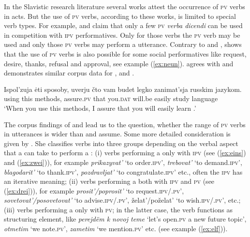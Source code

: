 \documentclass[output=paper,colorlinks,citecolor=brown,newtxmath,hidelinks]{langscibook}
\begin{document}
In the Slavistic research literature several works attest the occurrence of \textsc{pv}  verbs in  acts. But the use of \textsc{pv} verbs, according to these works, is limited to special verb types. For example, \citet{Rjabceva1992} and \citet{Dickey2000} claim that only a few \textsc{pv} \textit{verba dicendi} can be used in competition with \textsc{ipv} performatives. Only for those verbs the \textsc{pv} verb may be used and only those \textsc{pv} verbs may perform a  utterance. Contrary to \citeauthor{Rjabceva1992} and \citeauthor{Dickey2000}, \citeauthor{Wiemer2014} shows that the use of \textsc{pv}  verbs is also possible for some social performatives like request, desire, thanks, refusal and approval, see example (\ref{ex:neun}). \citet{Laczinski2014} agrees with \citeauthor{Wiemer2014} and demonstrates similar corpus data for ,  and .

\ea\label{ex:neun}
\gll Ispol’zuja ėti sposoby, uverju čto vam budet legko zanimat’sja russkim jazykom.\\
             using               this         methods,	assure\textsc{.pv}	   that	         you.\textsc{dat}	  will.be        easily          study                          language\\
\glt ‘When you use this methods, I assure that you will easily learn .’\\
\hfill \citep[107]{Wiemer2014}
\z

\newpage 
\noindent The corpus findings of \citeauthor{Wiemer2014} and \citeauthor{Laczinski2014} lead us to the question, whether the range of \textsc{pv} verbs in  utterances is wider than \citeauthor{Rjabceva1992} and \citeauthor{Dickey2000} assume. Some more detailed consideration is given by \citet{Israeli1996,Israeli2001}. She classifies  verbs into three groups depending on the verbal aspect that a  can take to perform a  \citep[84]{Israeli2001}: (i) verbs performing a  only with \textsc{ipv} (see (\ref{ex:eins}) and (\ref{ex:zwei})), for example \textit{prikazyvat’} ‘to order\textsc{.ipv}’, \textit{trebovat’} ‘to demand\textsc{.ipv}’, \textit{blagodarit’} ‘to thank\textsc{.ipv}’, \textit{pozdravljat’} ‘to congratulate\textsc{.ipv}’ etc., often the \textsc{ipv}  has an iterative meaning; (ii) verbs performing a  both with \textsc{ipv} and \textsc{pv} (see (\ref{ex:drei})), for example \textit {prosit’/poprosit’} ‘to request\textsc{.ipv}/\textsc{.pv}’, \textit{sovetovat’/posovetovat’} ‘to advise\textsc{.ipv}/\textsc{.pv}’, želat’/poželat’ ‘to wish\textsc{.ipv}/\textsc{.pv}’, etc.; (iii) verbs performing a  only with \textsc{pv}; in the latter case, the verb functions as structuring element, like \textit{perejdëm k novoj teme} ‘let’s open\textsc{.pv} a new future topic’, \textit{otmetim} ‘we note\textsc{.pv}’, \textit{zametim} ‘we mention\textsc{.pv}’ etc. (see example (\ref{ex:elf})). 
\end{document}
